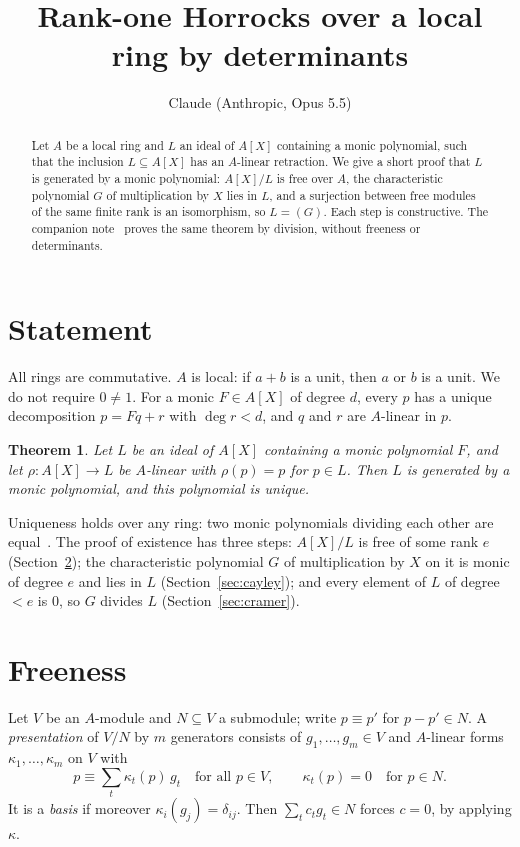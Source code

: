 \documentclass[11pt]{amsart}
\title{Rank-one Horrocks over a local ring by determinants}
\author{Claude (Anthropic, Opus 5.5)}
\date{}
\newtheorem{theorem}{Theorem}
\theoremstyle{remark}
\begin{document}
\begin{abstract}
Let $A$ be a local ring and $L$ an ideal of $A[X]$ containing a monic
polynomial, such that the inclusion $L\subseteq A[X]$ has an $A$-linear
retraction. We give a short proof that $L$ is generated by a monic
polynomial: $A[X]/L$ is free over $A$, the characteristic polynomial $G$ of
multiplication by $X$ lies in $L$, and a surjection between free modules of
the same finite rank is an isomorphism, so $L=(G)$. Each step is
constructive. The companion note~\cite{Div} proves the same theorem by
division, without freeness or determinants.
\end{abstract}

\maketitle

\section{Statement}

All rings are commutative. $A$ is local: if $a+b$ is a unit, then $a$ or $b$
is a unit. We do not require $0\neq1$. For a monic $F\in A[X]$ of degree $d$,
every $p$ has a unique decomposition $p=Fq+r$ with $\deg r<d$, and $q$ and $r$
are $A$-linear in $p$.

\begin{theorem}\label{thm:main}
Let $L$ be an ideal of $A[X]$ containing a monic polynomial $F$, and let
$\rho:A[X]\to L$ be $A$-linear with $\rho(p)=p$ for $p\in L$. Then $L$ is
generated by a monic polynomial, and this polynomial is unique.
\end{theorem}

Uniqueness holds over any ring: two monic polynomials dividing each other are
equal~\cite[Lemma~8]{Div}. The proof of existence has three steps:
$A[X]/L$ is free of some rank $e$ (Section~\ref{sec:free}); the
characteristic polynomial $G$ of multiplication by $X$ on it is monic of
degree $e$ and lies in $L$ (Section~\ref{sec:cayley}); and every element of
$L$ of degree $<e$ is $0$, so $G$ divides $L$ (Section~\ref{sec:cramer}).

\section{Freeness}\label{sec:free}

Let $V$ be an $A$-module and $N\subseteq V$ a submodule; write $p\equiv p'$
for $p-p'\in N$. A \emph{presentation} of $V/N$ by $m$ generators consists of
$g_1,\dots,g_m\in V$ and $A$-linear forms $\kappa_1,\dots,\kappa_m$ on $V$ with
\[
p\equiv\textstyle\sum_t\kappa_t(p)\,g_t\quad\text{for all }p\in V,
\qquad \kappa_t(p)=0\quad\text{for }p\in N.
\]
It is a \emph{basis} if moreover $\kappa_i(g_j)=\delta_{ij}$. Then
$\sum_tc_tg_t\in N$ forces $c=0$, by applying $\kappa$.
\end{document}
